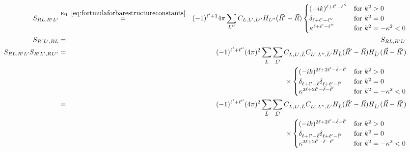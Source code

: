 \documentclass[11pt,a4paper]{report}
\begin{document}
\begin{eqnarray}
S_{RL,R'L'}
&\eqrel{eq:fortmulaforbarestructureconstants}{=}&
(-1)^{\ell'+1} 4\pi \sum_{L''} C_{L,L',L''} 
H_{L''}(\vec{R}'-\vec{R})
\begin{cases}
(-ik)^{\ell+\ell'-\ell''}&\text{for $k^2>0$}\\
\delta_{\ell+\ell'-\ell''}&\text{for $k^2=0$}\\
\kappa^{\ell+\ell'-\ell''}&\text{for $k^2=-\kappa^2<0$}\\
\end{cases}
\nonumber\\
%
%
S_{R'L',RL}&=&S_{RL,R'L'}
\nonumber\\
S_{RL,R'L'}S_{R'L',RL''}
&=&
(-1)^{\ell'+\ell''} (4\pi)^2 
\sum_{\bar{L}} 
\sum_{\bar{L'}} 
C_{L,L',\bar{L}} C_{L',L'',\bar{L}'} 
H_{\bar{L}}(\vec{R}'-\vec{R})
H_{\bar{L}'}(\vec{R}-\vec{R}')
\nonumber\\
&&\times
\begin{cases}
(-ik)^{2\ell+2\ell'-\bar{\ell}-\bar{\ell}'}&\text{for $k^2>0$}\\
\delta_{\ell+\ell'-\bar{\ell}}\delta_{\ell+\ell'-\bar{\ell}'}
&\text{for $k^2=0$}\\
\kappa^{2\ell+2\ell'-\bar{\ell}-\bar{\ell}'}
&\text{for $k^2=-\kappa^2<0$}\\
\end{cases}
\nonumber\\
%
&=&
(-1)^{\ell'+\ell''} (4\pi)^2 
\sum_{\bar{L}} 
\sum_{\bar{L'}} 
C_{L,L',\bar{L}} C_{L',L'',\bar{L}'} 
H_{\bar{L}}(\vec{R}'-\vec{R})
H_{\bar{L}'}(\vec{R}-\vec{R}')
\nonumber\\
&&\times
\begin{cases}
(-ik)^{2\ell+2\ell'-\bar{\ell}-\bar{\ell}'}&\text{for $k^2>0$}\\
\delta_{\ell+\ell'-\bar{\ell}}\delta_{\ell+\ell'-\bar{\ell}'}
&\text{for $k^2=0$}\\
\kappa^{2\ell+2\ell'-\bar{\ell}-\bar{\ell}'}
&\text{for $k^2=-\kappa^2<0$}\\
\end{cases}
\nonumber\\
\end{eqnarray}
\end{document}
